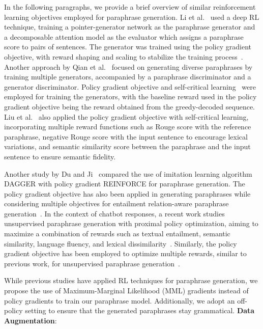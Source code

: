 \documentclass[11pt]{article}
\begin{document}
In the following paragraphs, we provide a brief overview of similar reinforcement learning objectives employed for paraphrase generation. Li et al.~\cite{li-etal-2018-paraphrase} used a deep RL technique, training a pointer-generator network as the paraphrase generator and a decomposable attention model as the evaluator which assigns a paraphrase score to pairs of sentences. The generator was trained using the policy gradient objective, with reward shaping and scaling to stabilize the training process~\cite{li-etal-2018-paraphrase}. Another approach by Qian et al.~\cite{qian-etal-2019-exploring} focused on generating diverse paraphrases by training multiple generators, accompanied by a paraphrase discriminator and a generator discriminator. Policy gradient objective and self-critical learning~\cite{DBLP:journals/corr/RennieMMRG16} were employed for training the generators, with the baseline reward used in the policy gradient objective being the reward obtained from the greedy-decoded sequence. Liu et al.~\cite{liu-etal-2020-learning} also applied the policy gradient objective with self-critical learning, incorporating multiple reward functions such as Rouge score with the reference paraphrase, negative Rouge score with the input sentence to encourage lexical variations, and semantic similarity score between the paraphrase and the input sentence to ensure semantic fidelity.

Another study by Du and Ji~\cite{du-ji-2019-empirical} compared the use of imitation learning algorithm DAGGER with policy gradient REINFORCE for paraphrase generation. The policy gradient objective has also been applied in generating paraphrases while considering multiple objectives for entailment relation-aware paraphrase generation~\cite{Sancheti_Srinivasan_Rudinger_2022}. In the context of chatbot responses, a recent work studies unsupervised paraphrase generation with proximal policy optimization, aiming to maximize a combination of rewards such as textual entailment, semantic similarity, language fluency, and lexical dissimilarity~\cite{DBLP:journals/corr/abs-2103-12777}. Similarly, the policy gradient objective has been employed to optimize multiple rewards, similar to previous work, for unsupervised paraphrase generation~\cite{10.1145/3394486.3403231}.

While previous studies have applied RL techniques for paraphrase generation, we propose the use of Maximum-Marginal Likelihood (MML) gradients instead of policy gradients to train our paraphrase model. Additionally, we adopt an off-policy setting to ensure that the generated paraphrases stay grammatical.
\noindent
{\bf Data Augmentation}:
\end{document}
